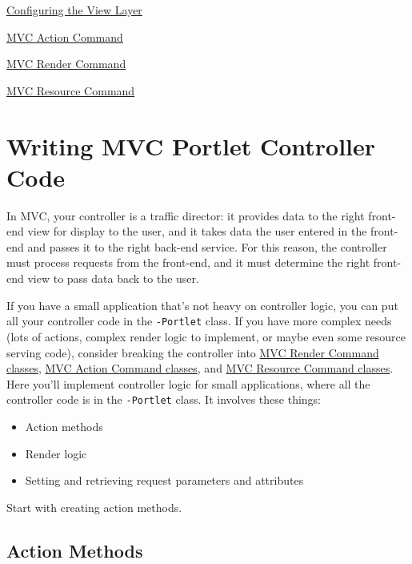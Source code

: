 \href{/docs/7-2/appdev/-/knowledge_base/a/configuring-the-view-layer}{Configuring
the View Layer}

\href{/docs/7-2/appdev/-/knowledge_base/a/mvc-action-command}{MVC Action
Command}

\href{/docs/7-2/appdev/-/knowledge_base/a/mvc-render-command}{MVC Render
Command}

\href{/docs/7-2/appdev/-/knowledge_base/a/mvc-resource-command}{MVC
Resource Command}

\chapter{Writing MVC Portlet Controller
Code}\label{writing-mvc-portlet-controller-code}

In MVC, your controller is a traffic director: it provides data to the
right front-end view for display to the user, and it takes data the user
entered in the front-end and passes it to the right back-end service.
For this reason, the controller must process requests from the
front-end, and it must determine the right front-end view to pass data
back to the user.

If you have a small application that's not heavy on controller logic,
you can put all your controller code in the \texttt{-Portlet} class. If
you have more complex needs (lots of actions, complex render logic to
implement, or maybe even some resource serving code), consider breaking
the controller into
\href{/docs/7-2/appdev/-/knowledge_base/a/mvc-render-command}{MVC Render
Command classes},
\href{/docs/7-2/appdev/-/knowledge_base/a/mvc-action-command}{MVC Action
Command classes}, and
\href{/docs/7-2/appdev/-/knowledge_base/a/mvc-resource-command}{MVC
Resource Command classes}. Here you'll implement controller logic for
small applications, where all the controller code is in the
\texttt{-Portlet} class. It involves these things:

\begin{itemize}
\tightlist
\item
  Action methods
\item
  Render logic
\item
  Setting and retrieving request parameters and attributes
\end{itemize}

Start with creating action methods.

\section{Action Methods}\label{action-methods}

